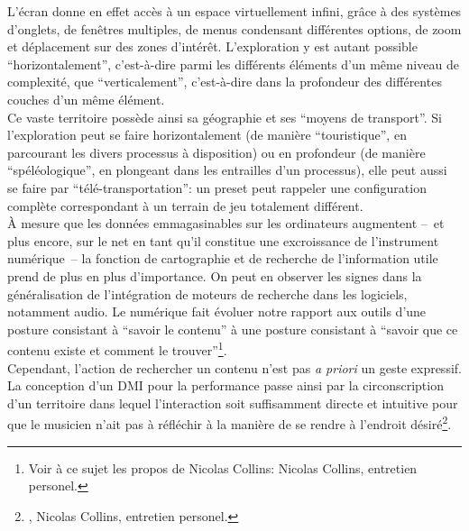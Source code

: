 \noindent L'écran donne en effet accès à un espace virtuellement infini, grâce à des systèmes d'onglets, de fenêtres multiples, de menus condensant différentes options, de zoom et déplacement sur des zones d'intérêt. L'exploration y est autant possible ``horizontalement'', c'est-à-dire parmi les différents éléments d'un même niveau de complexité, que ``verticalement'', c'est-à-dire dans la profondeur des différentes couches d'un même élément.\\
\indent Ce vaste territoire possède ainsi sa géographie et ses ``moyens de transport''. Si l'exploration peut se faire horizontalement (de manière ``touristique'', en parcourant les divers processus à disposition) ou en profondeur (de manière ``spéléologique'', en plongeant dans les entrailles d'un processus), elle peut aussi se faire par ``télé-transportation'': un preset peut rappeler une configuration complète correspondant à un terrain de jeu totalement différent.\\
\indent À mesure que les données emmagasinables sur les ordinateurs augmentent --~et plus encore, sur le net en tant qu'il constitue une excroissance de l'instrument numérique~-- la fonction de cartographie et de recherche de l'information utile prend de plus en plus d'importance. On peut en observer les signes dans la généralisation de l'intégration de moteurs de recherche dans les logiciels, notamment audio. Le numérique fait évoluer notre rapport aux outils d'une posture consistant à ``savoir le contenu'' à une posture consistant à ``savoir que ce contenu existe et comment le trouver''\footnote{Voir à ce sujet les propos de Nicolas Collins:  Nicolas Collins, entretien personel.}.\\
\indent Cependant, l'action de rechercher un contenu n'est pas \textit{a priori} un geste expressif. La conception d'un \gls{DMI} pour la performance passe ainsi par la circonscription d'un territoire dans lequel l'interaction soit suffisamment directe et intuitive pour que le musicien n'ait pas à réfléchir à la manière de se rendre à l'endroit désiré\footnote{, Nicolas Collins, entretien personel.}.


